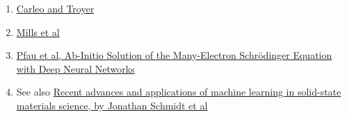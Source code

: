 \documentclass[%
oneside,                 %
final,                   %
10pt]{article}
\begin{document}
\begin{enumerate}
\item \href{{http://science.sciencemag.org/content/355/6325/602}}{Carleo and Troyer} 

\item \href{{https://journals.aps.org/pra/abstract/10.1103/PhysRevA.96.042113}}{Mills et al} 

\item \href{{https://arxiv.org/abs/1909.02487}}{Pfau et al, Ab-Initio Solution of the Many-Electron Schrödinger Equation with Deep Neural Networks}

\item See also \href{{https://www.nature.com/articles/s41524-019-0221-0}}{Recent advances and applications of machine learning in solid-state materials science, by  Jonathan Schmidt et al}
\end{enumerate}

\noindent

\end{document}
